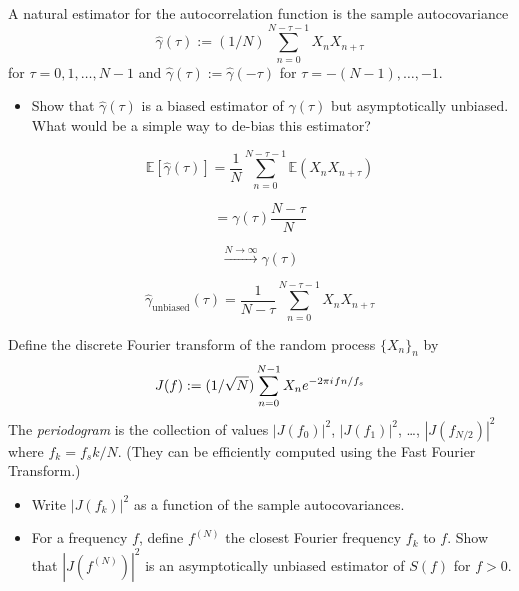 \documentclass[11pt]{article}
\begin{document}
\begin{exercise}
A natural estimator for the autocorrelation function is the sample autocovariance
\begin{equation}
    \hat{\gamma}(\tau) := (1/N) \sum_{n=0}^{N-\tau-1} X_n X_{n+\tau}
\end{equation}
for $\tau=0,1,\dots,N-1$ and $\hat{\gamma}(\tau):=\hat{\gamma}(-\tau)$ for $\tau=-(N-1),\dots,-1$.
\begin{itemize}
    \item Show that $\hat{\gamma}(\tau)$ is a biased estimator of $\gamma(\tau)$ but asymptotically unbiased.
    What would be a simple way to de-bias this estimator?
\end{itemize}

\end{exercise}

\begin{solution}

\[
\mathbb{E}\left[\hat{\gamma}(\tau)\right] = \frac{1}{N} \sum_{n=0}^{N-\tau-1} \mathbb{E}\left(X_n X_{n+\tau}\right)
\]

\[
= \gamma(\tau) \frac{N - \tau}{N}
\]

\[
\overset{N \to \infty}{\longrightarrow} \gamma(\tau)
\]

\[
\hat{\gamma}_{\text{unbiased}}(\tau) = \frac{1}{N-\tau} \sum_{n=0}^{N-\tau-1} X_n X_{n+\tau}
\]

\end{solution}

\begin{exercise}
Define the discrete Fourier transform of the random process $\{X_n\}_n$ by
\begin{equation}
    J(f) := (1/\sqrt{N})\sum_{n=0}^{N-1} X_n e^{-2\pi{i\mkern1mu} f n/f_s}
\end{equation}
The \textit{periodogram} is the collection of values $|J(f_0)|^2$, $|J(f_1)|^2$, \dots, $|J(f_{N/2})|^2$ where $f_k = f_s k/N$.
(They can be efficiently computed using the Fast Fourier Transform.)
\begin{itemize}
    \item Write $|J(f_k)|^2$ as a function of the sample autocovariances.
    \item For a frequency $f$, define $f^{(N)}$ the closest Fourier frequency $f_k$ to $f$.
    Show that $|J(f^{(N)})|^2$ is an asymptotically unbiased estimator of $S(f)$ for $f>0$.
\end{itemize}
\end{exercise}
\end{document}
